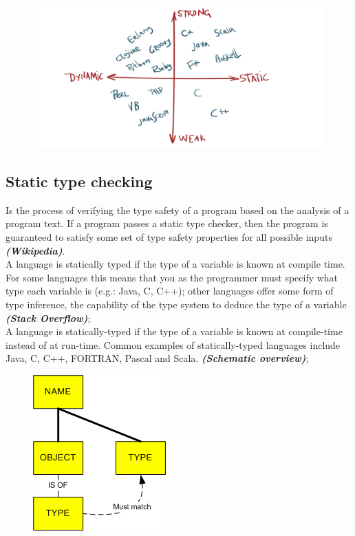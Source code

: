 \documentclass[12pt]{article}
\begin{document}
	\begin{figure}[h!]
		\centering
		\includegraphics[scale=0.20]{img/classification.png}
	\end{figure}

	\subsection{Static type checking}
		Is the process of verifying the type safety of a program based on the analysis of a program text.  If a program passes a static type checker, then the program is guaranteed to satisfy some set of type safety properties for all possible inputs \textit{\textbf{(Wikipedia)}}.\\
		A language is statically typed if the type of a variable is known at compile time. For some languages this means that you as the programmer must specify what type each variable is (e.g.: Java, C, C++); other languages offer some form of type inference, the capability of the type system to deduce the type of a variable \textit{\textbf{(Stack Overflow)}};\\
		A language is statically-typed if the type of a variable is known at compile-time instead of at run-time. Common examples of statically-typed languages include Java, C, C++, FORTRAN, Pascal and Scala. \textbf{\textit{(Schematic overview)}};\\
		
		\begin{figure}[h!]
			\centering
			\includegraphics[scale=0.60]{img/static.png}
		\end{figure}
	
\end{document}

